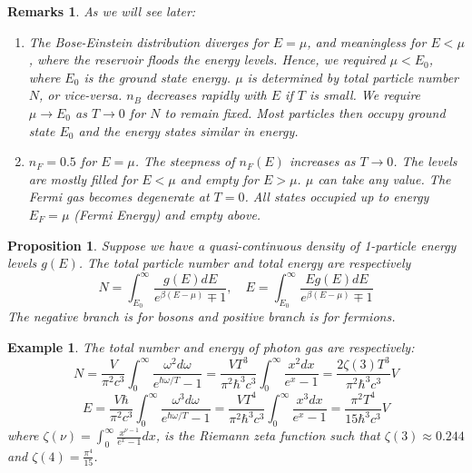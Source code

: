 \documentclass[a4paper]{article}
\newtheorem{eg}{Example}[section]
\newtheorem{remarks}{Remarks}[section]
\theoremstyle{new}
\newtheorem{prop}{Proposition}[section]
\begin{document}
\begin{remarks}
As we will see later:
\begin{enumerate}
    \item The Bose-Einstein distribution diverges for $E=\mu$, and meaningless for $E<\mu$, where the reservoir floods the energy levels. Hence, we required $\mu<E_0$, where $E_0$ is the ground state energy. $\mu$ is determined by total particle number $N$, or vice-versa. $n_B$ decreases rapidly with $E$ if $T$ is small. We require $\mu\rightarrow E_0$ as $T\rightarrow 0$ for $N$ to remain fixed. Most particles then occupy ground state $E_0$ and the energy states similar in energy. 
    \item $n_F=0.5$ for $E=\mu$. The steepness of $n_F(E)$ increases as $T\rightarrow 0$. The levels are mostly filled for $E<\mu$ and empty for $E>\mu$. $\mu$ can take any value. The Fermi gas becomes degenerate at $T=0$. All states occupied up to energy $E_F=\mu$ (Fermi Energy) and empty above.
\end{enumerate}
\end{remarks}
\begin{prop}
Suppose we have a quasi-continuous density of 1-particle energy levels $g(E)$. The total particle number and total energy are respectively
$$N=\int_{E_{0}}^\infty\frac{g(E)dE}{e^{\beta(E-\mu)}\mp 1},\quad E=\int_{E_{0}}^\infty\frac{E g(E)dE}{e^{\beta(E-\mu)}\mp 1}$$
The negative branch is for bosons and positive branch is for fermions. 
\end{prop}
\begin{eg}
The total number and energy of photon gas are respectively: 
$$N=\frac{V}{\pi^2c^3}\int_0^\infty\frac{\omega^2d\omega}{e^{\hbar\omega/T}-1}=\frac{VT^3}{\pi^2\hbar^3c^3}\int_0^\infty\frac{x^2dx}{e^x-1}=\frac{2\zeta(3)T^3}{\pi^2\hbar^3c^3}V$$
$$E=\frac{V\hbar}{\pi^2c^3}\int_0^\infty\frac{\omega^3d\omega}{e^{\hbar\omega/T}-1}=\frac{VT^4}{\pi^2\hbar^3c^3}\int_0^\infty\frac{x^3dx}{e^x-1}=\frac{\pi^2T^4}{15\hbar^3c^3}V$$
where $\zeta(\nu)=\int_0^\infty\frac{x^{\nu-1}}{e^x-1}dx$, is the Riemann zeta function such that $\zeta(3)\approx 0.244$ and $\zeta(4)=\frac{\pi^4}{15}$.
\end{eg}
\end{document}
